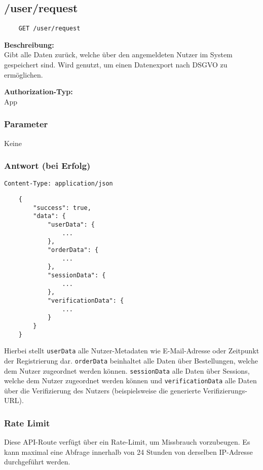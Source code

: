 \subsection{/user/request}

\begin{lstlisting}
    GET /user/request
\end{lstlisting}

\textbf{Beschreibung:} \\
Gibt alle Daten zurück, welche über den angemeldeten Nutzer im System gespeichert sind. Wird genutzt, um einen Datenexport nach DSGVO zu ermöglichen.

\textbf{Authorization-Typ:} \\
App

\subsubsection{Parameter}

Keine

\subsubsection{Antwort (bei Erfolg)}

\lstinline{Content-Type: application/json}
\begin{lstlisting}
    {
        "success": true, 
        "data": {
            "userData": {
                ...
            },
            "orderData": {
                ...
            },
            "sessionData": {
                ...
            },
            "verificationData": {
                ...
            }
        }
    }
\end{lstlisting}

Hierbei stellt \lstinline{userData} alle Nutzer-Metadaten wie E-Mail-Adresse oder Zeitpunkt der Registrierung dar. \lstinline{orderData} beinhaltet alle Daten über Bestellungen, welche dem Nutzer zugeordnet werden können. \lstinline{sessionData} alle Daten über Sessions, welche dem Nutzer zugeordnet werden können und \lstinline{verificationData} alle Daten über die Verifizierung des Nutzers (beispielsweise die generierte Verifizierungs-URL).

\subsubsection{Rate Limit}

Diese API-Route verfügt über ein Rate-Limit, um Missbrauch vorzubeugen. Es kann maximal eine Abfrage innerhalb von 24 Stunden von derselben IP-Adresse durchgeführt werden.